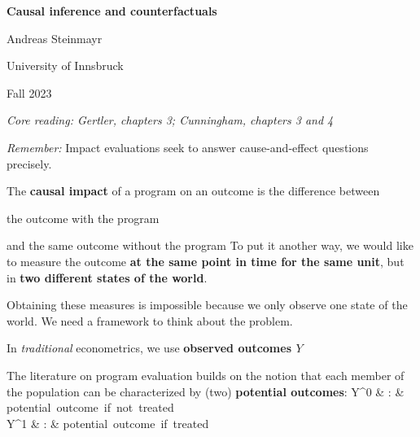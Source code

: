 \documentclass[
  25pt,         %
  a4paper,
  landscape,
  Screen4to3,
  footrule ]{foils}
\newcommand{\xx}{\item[{\small $\bullet$}]}
\begin{document}
\setlength{\parindent}{0pt}





\thispagestyle{empty}

\begin{center}

\textbf{Causal inference and counterfactuals} \\  \bigskip  \bigskip \bigskip
 \bigskip \bigskip \bigskip


Andreas Steinmayr \\ 
 \bigskip \bigskip \bigskip

University of Innsbruck \bigskip


Fall 2023 \\ \bigskip  \bigskip \bigskip \bigskip


\end{center}

\small{\textit{Core reading: Gertler, chapters 3; Cunningham, chapters 3 and 4}}


\begin{small}
\textit{Remember:} Impact evaluations seek to answer cause-and-effect questions precisely.


The \textbf{causal impact} of a program on an outcome is the difference between
\bi
\xx the outcome with the program
\xx and the same outcome without the program
\ei
To put it another way, we would like to measure the outcome \textbf{at the same point in time for the same unit}, but in \textbf{two different states of the world}.

Obtaining these measures is impossible because we only observe one state of the world. We need a framework to think about the problem.
\end{small}



\bi

\x In \textit{traditional} econometrics, we use \textbf{observed outcomes $Y$} 

\vsm

\x The literature on program evaluation builds on the notion that
each member of the population can be characterized by (two)
\textbf{potential outcomes}: \vsm
    \bea
    Y^0 & : & \mbox{potential outcome if not treated} \nonumber
    \\[-2mm]
    Y^1 & : & \mbox{potential outcome if treated} \nonumber
    \eea
\end{document}
